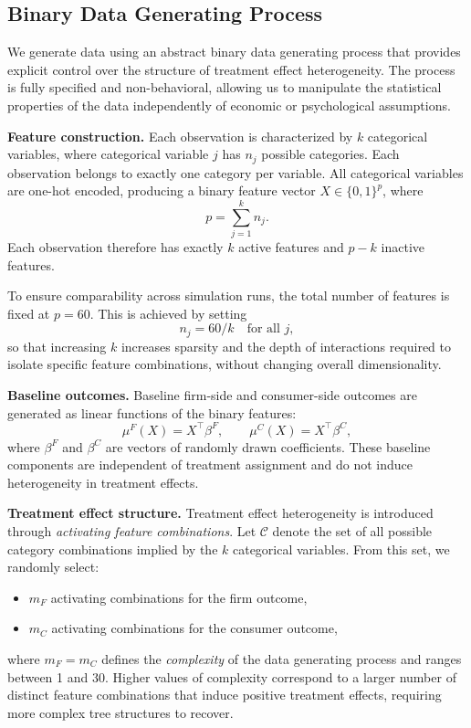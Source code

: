 \documentclass[11pt,letterpaper,english]{article}
\theoremstyle{definition}
\theoremstyle{definition}
\begin{document}
\begin{bibunit}
\subsection{Binary Data Generating Process}
\label{sec:binary-dgp}

We generate data using an abstract binary data generating process that provides explicit control over the structure of treatment effect heterogeneity. The process is fully specified and non-behavioral, allowing us to manipulate the statistical properties of the data independently of economic or psychological assumptions.

\textbf{Feature construction.}
Each observation is characterized by $k$ categorical variables, where categorical variable $j$ has $n_j$ possible categories. Each observation belongs to exactly one category per variable. All categorical variables are one-hot encoded, producing a binary feature vector $X \in \{0,1\}^p$, where
\[
p = \sum_{j=1}^k n_j.
\]
Each observation therefore has exactly $k$ active features and $p-k$ inactive features.

To ensure comparability across simulation runs, the total number of features is fixed at $p=60$. This is achieved by setting
\[
n_j = 60 / k \quad \text{for all } j,
\]
so that increasing $k$ increases sparsity and the depth of interactions required to isolate specific feature combinations, without changing overall dimensionality.

\vspace{6pt}
\noindent
\textbf{Baseline outcomes.}
Baseline firm-side and consumer-side outcomes are generated as linear functions of the binary features:
\[
\mu^F(X) = X^\top \beta^F, \qquad \mu^C(X) = X^\top \beta^C,
\]
where $\beta^F$ and $\beta^C$ are vectors of randomly drawn coefficients. These baseline components are independent of treatment assignment and do not induce heterogeneity in treatment effects.

\vspace{6pt}
\noindent
\textbf{Treatment effect structure.}
Treatment effect heterogeneity is introduced through \emph{activating feature combinations}. Let $\mathcal{C}$ denote the set of all possible category combinations implied by the $k$ categorical variables. From this set, we randomly select:
\begin{itemize}
    \item $m_F$ activating combinations for the firm outcome,
    \item $m_C$ activating combinations for the consumer outcome,
\end{itemize}
where $m_F = m_C$ defines the \emph{complexity} of the data generating process and ranges between 1 and 30. Higher values of complexity correspond to a larger number of distinct feature combinations that induce positive treatment effects, requiring more complex tree structures to recover.


\end{bibunit}
\end{document}
